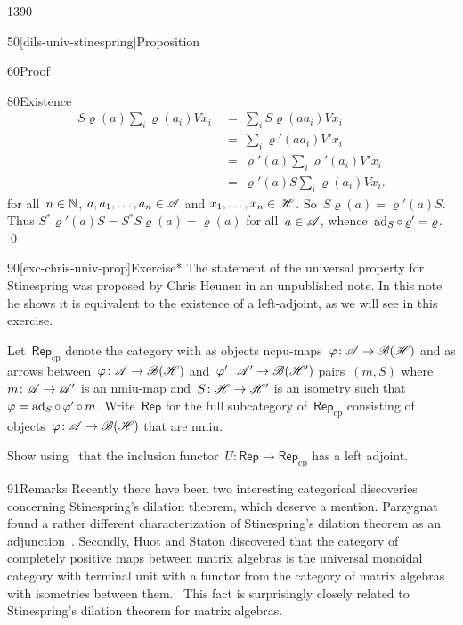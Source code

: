 \begin{parsec}{1390}
\begin{point}{50}[dils-univ-stinespring]{Proposition}
\begin{point}{60}{Proof}
\begin{point}{80}{Existence}
\begin{align*}
    S \varrho(a) \sum_i \varrho(a_i)Vx_i
    &\ =\  \sum_i S \varrho(aa_i) Vx_i \\
    &\ =\  \sum_i \varrho'(aa_i) V'x_i \\
    &\  =\ \varrho'(a) \sum_i \varrho'(a_i)V'x_i\\
    &\ =\ \varrho'(a) S \sum_i \varrho(a_i)V x_i.
\end{align*}
for all~$n \in \mathbb{N}$, $a, a_1, \ldots, a_n \in \mathscr{A}$ and
    $x_1, \ldots, x_n \in \mathscr{H}$.
So~$S \varrho(a) = \varrho'(a)S$.
Thus $S^* \varrho'(a) S = S^*S\varrho(a) = \varrho(a)$ for all~$a\in \mathscr{A}$,
whence~$\mathrm{ad}_S \mathop{\circ} \varrho' = \varrho$. \qed
\end{point}
\end{point}
\end{point}

\spacingfix{}
\begin{point}{90}[exc-chris-univ-prop]{Exercise*}%
    The statement of the universal property
        for Stinespring
        was proposed by Chris Heunen in an unpublished note.
    In this note he shows it is equivalent to the existence
        of a left-adjoint, as we will see in this exercise.
    
    Let~$\mathsf{Rep}_{\mathrm{cp}}$
        denote the category with as objects
            ncpu-maps~$\varphi\colon \mathscr{A} \to \mathscr{B}(\mathscr{H})$
            and as arrows between~$\varphi\colon \mathscr{A} \to \mathscr{B}(\mathscr{H})$
            and~$\varphi'\colon \mathscr{A}' \to \mathscr{B}(\mathscr{H}')$
            pairs~$(m, S)$
            where~$m\colon \mathscr{A} \to \mathscr{A}'$ is an nmiu-map
            and~$S\colon \mathscr{H} \to \mathscr{H}'$ is an isometry
            such that~$\varphi = \mathrm{ad}_S \mathop{\circ} \varphi' \mathop{\circ} m$.
    Write~$\mathsf{Rep}$
        for the full subcategory of~$\mathsf{Rep}_{\mathrm{cp}}$
        consisting of objects~$\varphi\colon \mathscr{A} \to \mathscr{B}(\mathscr{H})$
            that are nmiu.

Show using~
    that the inclusion functor~$U \colon \mathsf{Rep}
    \to \mathsf{Rep}_{\mathrm{cp}}$ has a left adjoint.
\begin{point}{91}{Remarks}%
Recently there have been two interesting categorical
    discoveries concerning Stinespring's dilation theorem,
    which deserve a mention.
Parzygnat found a rather different characterization
    of Stinespring's dilation
    theorem as an adjunction~\cite{parzygnat2018stinespring}.
Secondly, Huot and Staton discovered
    that the category of completely positive maps
    between matrix algebras
    is the universal monoidal category with terminal unit
    with a functor from the category of matrix algebras
    with isometries between them.~\cite{huot}
This fact is surprisingly closely related
    to Stinespring's dilation theorem for matrix algebras.
\end{point}


\end{point}
\end{parsec}
